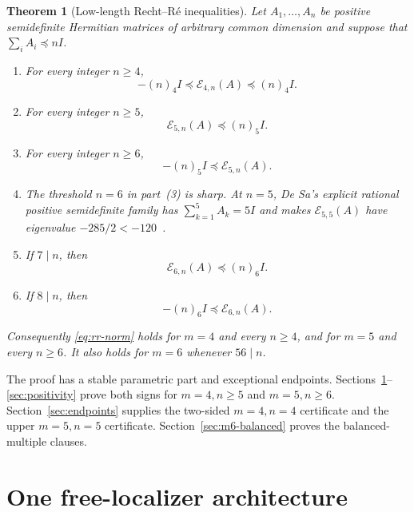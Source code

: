 \documentclass[11pt]{article}
\newtheorem{theorem}{Theorem}[section]
\newcommand{\E}{\mathcal E}
\newcommand{\fall}[2]{(#1)_{#2}}
\begin{document}
\begin{theorem}[Low-length Recht--R\'e inequalities]\label{thm:main}
Let \(A_1,\ldots,A_n\) be positive semidefinite Hermitian matrices of arbitrary common dimension and suppose that \(\sum_iA_i\preceq nI\).
\begin{enumerate}
\item For every integer \(n\ge4\),
\begin{equation}\label{eq:thm-m4}
 -\fall n4I\preceq\E_{4,n}(A)\preceq\fall n4I.
\end{equation}
\item For every integer \(n\ge5\),
\begin{equation}\label{eq:thm-m5-upper}
 \E_{5,n}(A)\preceq\fall n5I.
\end{equation}
\item For every integer \(n\ge6\),
\begin{equation}\label{eq:thm-m5-lower}
 -\fall n5I\preceq\E_{5,n}(A).
\end{equation}
\item The threshold \(n=6\) in part~(3) is sharp.  At \(n=5\), De Sa's explicit rational positive semidefinite family has \(\sum_{k=1}^5A_k=5I\) and makes \(\E_{5,5}(A)\) have eigenvalue
\(-285/2<-120\)~\cite{DeSa2020}.
\item If \(7\mid n\), then
\begin{equation}\label{eq:thm-m6-upper}
 \E_{6,n}(A)\preceq\fall n6I.
\end{equation}
\item If \(8\mid n\), then
\begin{equation}\label{eq:thm-m6-lower}
 -\fall n6I\preceq\E_{6,n}(A).
\end{equation}
\end{enumerate}
Consequently \eqref{eq:rr-norm} holds for \(m=4\) and every \(n\ge4\), and for \(m=5\) and every \(n\ge6\).
It also holds for \(m=6\) whenever \(56\mid n\).
\end{theorem}

The proof has a stable parametric part and exceptional endpoints.  Sections~\ref{sec:free}--\ref{sec:positivity} prove both signs for \(m=4,n\ge5\) and \(m=5,n\ge6\).  Section~\ref{sec:endpoints} supplies the two-sided \(m=4,n=4\) certificate and the upper \(m=5,n=5\) certificate.
Section~\ref{sec:m6-balanced} proves the balanced-multiple clauses.

\section{One free-localizer architecture}\label{sec:free}
\end{document}
